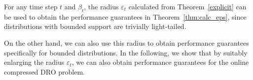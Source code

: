 \documentclass[12pt]{article}
\newcommand{\bnote}[1]{\textcolor{purple}{\textbf{[B: #1]}}}
\newcommand{\prob}{{\mathbf P}}
\newcommand{\epsnom}{\varepsilon}
\begin{document}

For any time step $t$ and $\beta_t$, the radius $\epsnom_t$ calculated from Theorem~\ref{explicit} can be used to obtain the performance guarantees in Theorem~\ref{thm:calc_eps}, since distributions with bounded support are trivially light-tailed. 

On the other hand, we can also use this radius to obtain performance guarantees specifically for bounded distributions. 
In the following, we show that by suitably enlarging the radius $\epsnom_t$, we can also obtain performance guarantees for the online compressed \gls{DRO} problem. 
\end{document}
